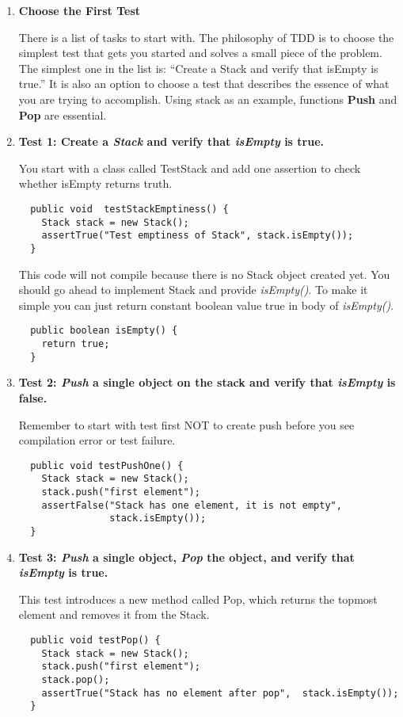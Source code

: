\begin{enumerate}
\item \textbf{Choose the First Test}

There is a list of tasks to start with. The philosophy of TDD is to
choose the simplest test that gets you started and solves a small
piece of the problem. The simplest one in the list is: ``Create a
Stack and verify that isEmpty is true.'' It is also an option to
choose a test that describes the essence of what you are trying to
accomplish. Using stack as an example, functions \textbf{Push} and
\textbf{Pop} are essential.

\item \textbf{Test 1: Create a {\em Stack} and verify that {\em isEmpty} is true.}

You start with a class called TestStack and add one assertion to check
whether isEmpty returns truth.
{\small\begin{verbatim}
  public void  testStackEmptiness() {
    Stack stack = new Stack();
    assertTrue("Test emptiness of Stack", stack.isEmpty());	
  }
\end{verbatim}}

This code will not compile because there is no Stack object created
yet. You should go ahead to implement Stack and provide
\textit{isEmpty()}. To make it simple you can just return constant
boolean value true in body of \textit{isEmpty()}.
{\small\begin{verbatim}
  public boolean isEmpty() {
    return true;
  }
\end{verbatim}}

\item {\textbf{Test 2: {\em Push} a single object on the stack and verify that {\em isEmpty} is false.}}

Remember to start with test first NOT to create push before you see
compilation error or test failure.
{\small\begin{verbatim}
  public void testPushOne() {	
    Stack stack = new Stack();
    stack.push("first element");
    assertFalse("Stack has one element, it is not empty", 
                stack.isEmpty());
  }
\end{verbatim}}

\item {\textbf{Test 3: {\em Push} a single object, {\em Pop} the object, and verify that {\em isEmpty} is true.}}

This test introduces a new method called Pop, which returns the
topmost element and removes it from the Stack.

{\small\begin{verbatim}
  public void testPop() {	
    Stack stack = new Stack();
    stack.push("first element");
    stack.pop();
    assertTrue("Stack has no element after pop",  stack.isEmpty());
  }
\end{verbatim}}


\end{enumerate}
